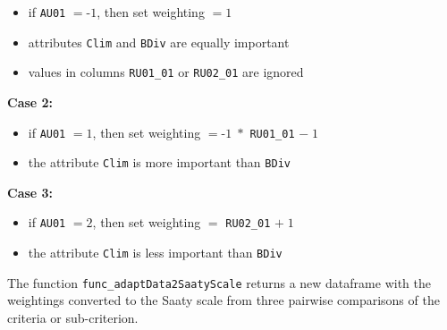 \documentclass [oneside,10pt,a4paper,ngerman,BCOR10mm,headsepline,parindent,final]{scrartcl}
\providecommand{\tightlist}{%
      \setlength{\itemsep}{0pt}\setlength{\parskip}{0pt}}
\begin{document}
\begin{itemize}
\tightlist
\item
  if \texttt{AU01} \(= \text{-}1\), then set weighting \(= 1\)
\item
  attributes \texttt{Clim} and \texttt{BDiv} are equally important
\item
  values in columns \texttt{RU01\_01} or \texttt{RU02\_01} are ignored
\end{itemize}

\textbf{Case 2:}

\begin{itemize}
\tightlist
\item
  if \texttt{AU01} \(= 1\), then set weighting \(= \text{-}1\;*\)
  \texttt{RU01\_01} \(-\;1\)
\item
  the attribute \texttt{Clim} is more important than \texttt{BDiv}
\end{itemize}

\textbf{Case 3:}

\begin{itemize}
\tightlist
\item
  if \texttt{AU01} \(= 2\), then set weighting \(=\) \texttt{RU02\_01}
  \(+\;1\)
\item
  the attribute \texttt{Clim} is less important than \texttt{BDiv}
\end{itemize}

The function \texttt{func\_adaptData2SaatyScale} returns a new dataframe
with the weightings converted to the Saaty scale from three pairwise
comparisons of the criteria or sub-criterion.
\end{document}

